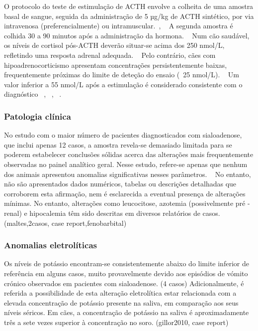 O protocolo do teste de estimulação de ACTH envolve a colheita de uma amostra basal de sangue, seguida da administração de 5 µg/kg de ACTH sintético, por via intravenosa (preferencialmente) ou intramuscular.~\cite{Spence2018}, ~\cite{Mooney2023} A segunda amostra é colhida 30 a 90 minutos após a administração da hormona. ~\cite{Spence2018}
Num cão saudável, os níveis de cortisol pós-ACTH deverão situar-se acima dos 250 nmol/L, refletindo uma resposta adrenal adequada. ~\cite{Mooney2023} Pelo contrário, cães com hipoadrenocorticismo apresentam concentrações persistentemente baixas, frequentemente próximas do limite de deteção do ensaio (~25 nmol/L). ~\cite{Mooney2023} Um valor inferior a 55 nmol/L após a estimulação é considerado consistente com o diagnóstico ~\cite{Wakayama2017}, ~\cite{Mooney2023}, ~\cite{Guzman-Ramos2022}.

\subsubsection{Patologia clínica}


No estudo com o maior número de pacientes diagnosticados com sialoadenose, que inclui apenas 12 casos, a amostra revela-se demasiado limitada para se poderem estabelecer conclusões sólidas acerca das alterações mais frequentemente observadas no painel analítico geral. Nesse estudo, refere-se apenas que nenhum dos animais apresentou anomalias significativas nesses parâmetros. ~\cite{boydell_sialadenosis_2000} No entanto, não são apresentados dados numéricos, tabelas ou descrições detalhadas que corroborem esta afirmação, nem é esclarecida a eventual presença de alterações mínimas.
No entanto, alterações como leucocitose, azotemia (possivelmente pré -renal) e hipocalemia têm sido descritas em diversos relatórios de casos. (maltes,2casos, case report,fenobarbital)


\subsubsection{Anomalias eletrolíticas}


Os níveis de potássio encontram-se consistentemente abaixo do limite inferior de referência em alguns casos, muito provavelmente devido aos episódios de vómito crónico observados em pacientes com sialoadenose. (4 casos) Adicionalmente, é referida a possibilidade de esta alteração eletrolítica estar relacionada com a elevada concentração de potássio presente na saliva, em comparação aos seus níveis séricos. Em cães, a concentração de potássio na saliva é aproximadamente três a sete vezes superior à concentração no soro. (gillor2010, case report)


